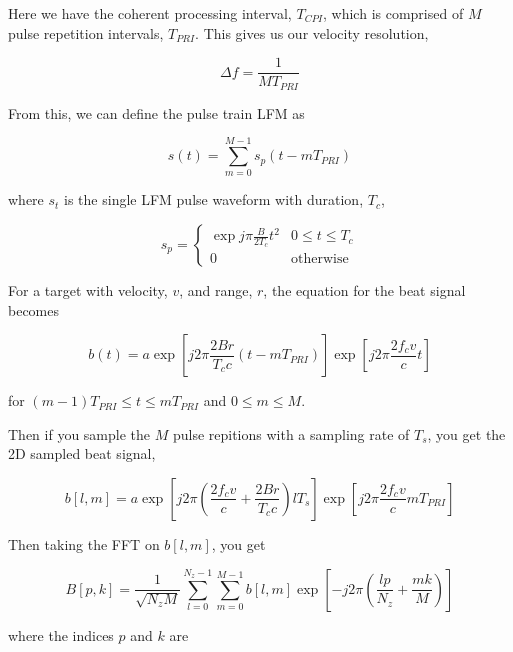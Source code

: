 \documentclass[preview]{standalone}
\begin{document}
\begin{center}
Here we have the coherent processing interval, $T_{CPI}$, which is comprised of $M$ pulse repetition intervals, $T_{PRI}$. This gives us our velocity resolution, 

\begin{equation}
    \Delta f = \frac{1}{M T_{PRI}}
\end{equation}

From this, we can define the pulse train LFM as

\begin{equation}
    s(t) = \sum_{m=0}^{M-1} s_p(t - m T_{PRI})
\end{equation}

where $s_t$ is the single LFM pulse waveform with duration, $T_c$,

\begin{equation}
    s_p = \begin{cases} 
      \exp{j \pi \frac{B}{2 T_c} t^2} & 0 \le t \le T_c \\
      0 & \text{otherwise}
   \end{cases}
\end{equation}

For a target with velocity, $v$, and range, $r$, the equation for the beat signal becomes

\begin{equation}
    b(t) = a \exp{\left[ j 2 \pi \frac{2 B r}{T_c c} (t - m T_{PRI}) \right]} \exp{\left[ j 2 \pi \frac{2 f_c v}{c} t \right]}
\end{equation}

for $(m-1) T_{PRI} \le t \le m T_{PRI}$ and $0 \le m \le M$.

Then if you sample the $M$ pulse repitions with a sampling rate of $T_s$, you get the 2D sampled beat signal,

\begin{equation}
    b[l, m] = a \exp{\left[ j 2 \pi \left( \frac{2 f_c v}{c} + \frac{2 B r}{T_c c} \right) l T_s \right]} \exp{\left[ j 2 \pi \frac{2 f_c v}{c} m T_{PRI} \right]}
\end{equation}

Then taking the FFT on $b[l, m]$, you get

\begin{equation}
    B[p, k] = \frac{1}{\sqrt{N_z M}} \sum_{l=0}^{N_z-1} \sum_{m=0}^{M-1} b[l, m] \exp{\left[ -j 2 \pi \left( \frac{lp}{N_z} + \frac{mk}{M} \right) \right]}
\end{equation}

where the indices $p$ and $k$ are
\end{center}
\end{document}

